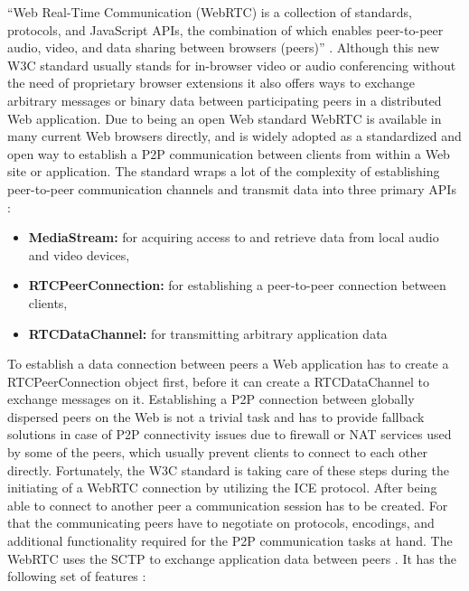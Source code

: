 ``Web Real-Time Communication (\gls{WebRTC}) is a collection of standards, protocols, and JavaScript \gls{API}s, the combination of which enables peer-to-peer audio, video, and data sharing between browsers (peers)'' \citep[pg. 307]{grigorik2013high}. Although this new \gls{W3C} standard usually stands for in-browser video or audio conferencing without the need of proprietary browser extensions it also offers ways to exchange arbitrary messages or binary data between participating peers in a distributed Web application. Due to being an open Web standard \gls{WebRTC} is available in many current Web browsers directly, and is widely adopted as a standardized and open way to establish a \gls{P2P} communication between clients from within a Web site or application. The standard wraps a lot of the complexity of establishing peer-to-peer communication channels and transmit data into three primary \gls{API}s \citep[pg. 307-308]{grigorik2013high}: \@

\begin{itemize}
	\item \textbf{MediaStream:} for acquiring access to and retrieve data from local audio and video devices,
	\item \textbf{RTCPeerConnection:} for establishing a peer-to-peer connection between clients,
	\item \textbf{RTCDataChannel:} for transmitting arbitrary application data
\end{itemize}

To establish a data connection between peers a Web application has to create a RTCPeerConnection object first, before it can create a RTCDataChannel to exchange messages on it. Establishing a \gls{P2P} connection between globally dispersed peers on the Web is not a trivial task and has to provide fallback solutions in case of \gls{P2P} connectivity issues due to firewall or \gls{NAT} services used by some of the peers, which usually prevent clients to connect to each other directly. Fortunately, the \gls{W3C} standard is taking care of these steps during the initiating of a \gls{WebRTC} connection by utilizing the \gls{ICE} protocol. After being able to connect to another peer a communication session has to be created. For that the communicating peers have to negotiate on protocols, encodings, and additional functionality required for the \gls{P2P} communication tasks at hand. The \gls{WebRTC} uses the \gls{SCTP} to exchange application data between peers \citep[pg. 315-330]{grigorik2013high}. It has the following set of features \citep[pg. 342]{grigorik2013high}: \@

